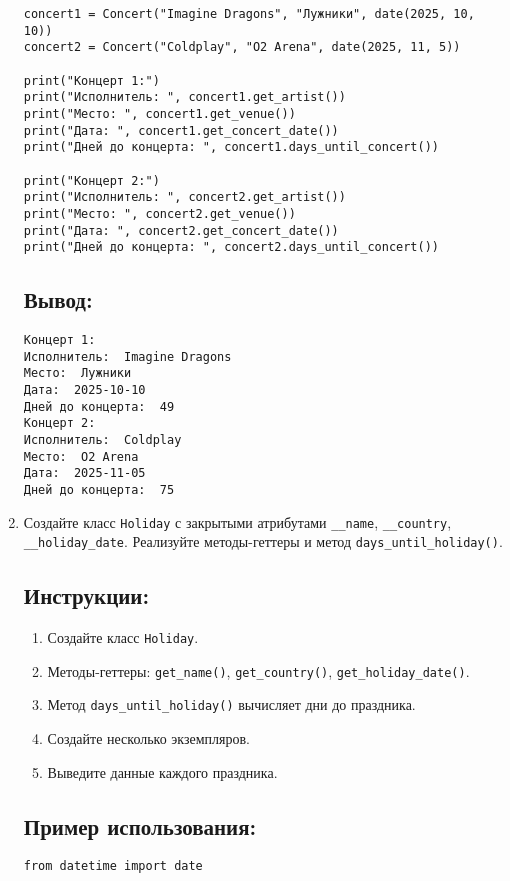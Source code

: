 \begin{enumerate}
\begin{lstlisting}[caption=Пример кода]
concert1 = Concert("Imagine Dragons", "Лужники", date(2025, 10, 10))
concert2 = Concert("Coldplay", "O2 Arena", date(2025, 11, 5))

print("Концерт 1:")
print("Исполнитель: ", concert1.get_artist())
print("Место: ", concert1.get_venue())
print("Дата: ", concert1.get_concert_date())
print("Дней до концерта: ", concert1.days_until_concert())

print("Концерт 2:")
print("Исполнитель: ", concert2.get_artist())
print("Место: ", concert2.get_venue())
print("Дата: ", concert2.get_concert_date())
print("Дней до концерта: ", concert2.days_until_concert())
\end{lstlisting}

\subsection*{Вывод:}
\begin{lstlisting}[caption=Ожидаемый вывод]
Концерт 1:
Исполнитель:  Imagine Dragons
Место:  Лужники
Дата:  2025-10-10
Дней до концерта:  49
Концерт 2:
Исполнитель:  Coldplay
Место:  O2 Arena
Дата:  2025-11-05
Дней до концерта:  75
\end{lstlisting}

\item
Создайте класс \texttt{Holiday} с закрытыми атрибутами \texttt{\_\_name}, \texttt{\_\_country}, \texttt{\_\_holiday\_date}. Реализуйте методы-геттеры и метод \texttt{days\_until\_holiday()}.

\subsection*{Инструкции:}
\begin{enumerate}
    \item Создайте класс \texttt{Holiday}.
    \item Методы-геттеры: \texttt{get\_name()}, \texttt{get\_country()}, \texttt{get\_holiday\_date()}.
    \item Метод \texttt{days\_until\_holiday()} вычисляет дни до праздника.
    \item Создайте несколько экземпляров.
    \item Выведите данные каждого праздника.
\end{enumerate}

\subsection*{Пример использования:}
\begin{lstlisting}[caption=Пример кода]
from datetime import date


\end{lstlisting}
\end{enumerate}
